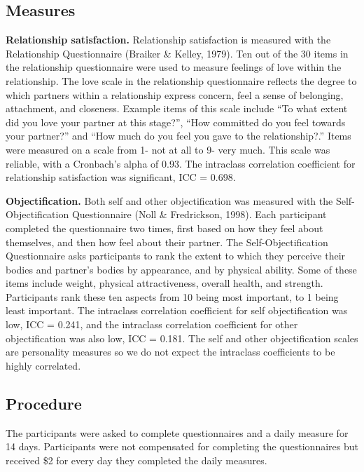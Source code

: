 \documentclass[
  man]{apa6}
\begin{document}
\hypertarget{measures}{%
\subsection{Measures}\label{measures}}

\textbf{Relationship satisfaction.} Relationship satisfaction is measured with the Relationship Questionnaire (Braiker \& Kelley, 1979). Ten out of the 30 items in the relationship questionnaire were used to measure feelings of love within the relationship. The love scale in the relationship questionnaire reflects the degree to which partners within a relationship express concern, feel a sense of belonging, attachment, and closeness. Example items of this scale include ``To what extent did you love your partner at this stage?'', ``How committed do you feel towards your partner?'' and ``How much do you feel you gave to the relationship?.'' Items were measured on a scale from 1- not at all to 9- very much. This scale was reliable, with a Cronbach's alpha of 0.93. The intraclass correlation coefficient for relationship satisfaction was significant, ICC = 0.698.

\textbf{Objectification.} Both self and other objectification was measured with the Self-Objectification Questionnaire (Noll \& Fredrickson, 1998). Each participant completed the questionnaire two times, first based on how they feel about themselves, and then how feel about their partner. The Self-Objectification Questionnaire asks participants to rank the extent to which they perceive their bodies and partner's bodies by appearance, and by physical ability. Some of these items include weight, physical attractiveness, overall health, and strength. Participants rank these ten aspects from 10 being most important, to 1 being least important. The intraclass correlation coefficient for self objectification was low, ICC = 0.241, and the intraclass correlation coefficient for other objectification was also low, ICC = 0.181. The self and other objectification scales are personality measures so we do not expect the intraclass coefficients to be highly correlated.

\hypertarget{procedure}{%
\subsection{Procedure}\label{procedure}}

The participants were asked to complete questionnaires and a daily measure for 14 days. Participants were not compensated for completing the questionnaires but received \$2 for every day they completed the daily measures.
\end{document}

